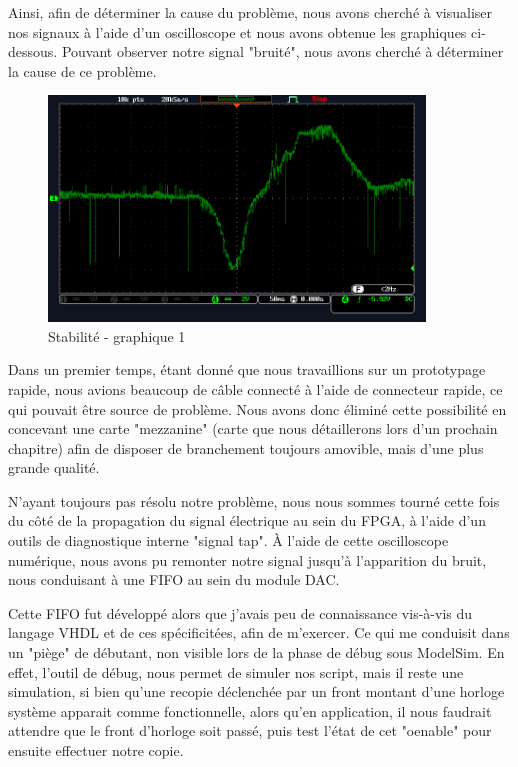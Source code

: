 \documentclass[french,a4paper,12pt]{report}
\begin{document}
		Ainsi, afin de déterminer la cause du problème, nous avons cherché à visualiser nos signaux à l'aide d'un oscilloscope et nous avons obtenue les graphiques ci-dessous. Pouvant observer notre signal "bruité", nous avons cherché à déterminer la cause de ce problème.
		
		\begin{figure}[!ht]
    \center
  	\includegraphics[width=10cm]{bruit1.PNG}
		\caption{Stabilité - graphique 1}
	\end{figure}
	
	Dans un premier temps, étant donné que nous travaillions sur un prototypage rapide, nous avions beaucoup de câble connecté à l'aide de connecteur rapide, ce qui pouvait être source de problème. Nous avons donc éliminé cette possibilité en concevant une carte "mezzanine" (carte que nous détaillerons lors d'un prochain chapitre) afin de disposer de branchement toujours amovible, mais d'une plus grande qualité.
	
	N'ayant toujours pas résolu notre problème, nous nous sommes tourné cette fois du côté de la propagation du signal électrique au sein du FPGA, à l'aide d'un outils de diagnostique interne "signal tap". À l'aide de cette oscilloscope numérique, nous avons pu remonter notre signal jusqu'à l'apparition du bruit, nous conduisant à une FIFO au sein du module DAC.
	
	Cette FIFO fut développé alors que j'avais peu de connaissance vis-à-vis du langage VHDL et de ces spécificitées, afin de m'exercer. Ce qui me conduisit dans un "piège" de débutant, non visible lors de la phase de débug sous ModelSim. En effet, l'outil de débug, nous permet de simuler nos script, mais il reste une simulation, si bien qu'une recopie déclenchée par un front montant d'une horloge système apparait comme fonctionnelle, alors qu'en application, il nous faudrait attendre que le front d'horloge soit passé, puis test l'état de cet "oenable" pour ensuite effectuer notre copie.
	
\end{document}
